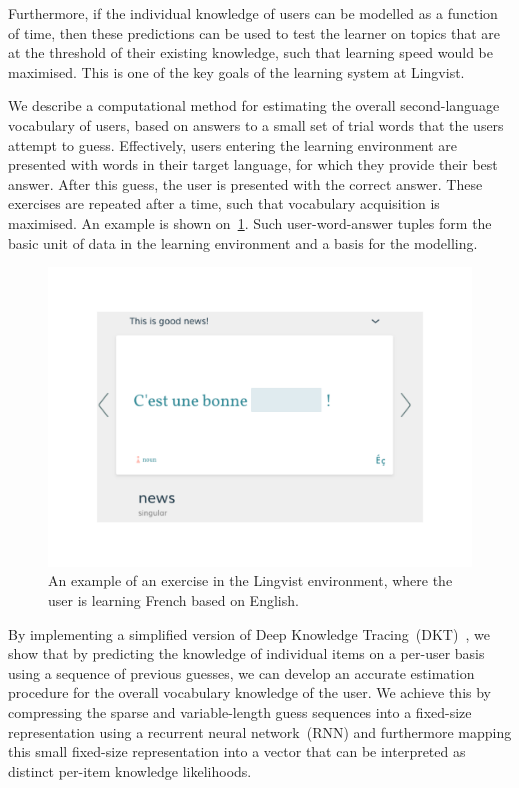 Furthermore, if the individual knowledge of users can be modelled as a function of time, then these predictions can be used to test the learner on topics that are at the threshold of their existing knowledge, such that learning speed would be maximised. This is one of the key goals of the learning system at Lingvist.

We describe a computational method for estimating the overall second-language vocabulary of users, based on answers to a small set of trial words that the users attempt to guess. Effectively, users entering the learning environment are presented with words in their target language, for which they provide their best answer. After this guess, the user is presented with the correct answer. These exercises are repeated after a time, such that vocabulary acquisition is maximised. An example is shown on~\cref{fig:lu_example}. Such user-word-answer tuples form the basic unit of data in the learning environment and a basis for the modelling.

\begin{figure}
\centering
\includegraphics[width=0.6\linewidth]{figures/lingvist/example_lu.pdf}
\caption[An example exercise in the Lingvist environment]{An example of an exercise in the Lingvist environment, where the user is learning French based on English.} 
\label{fig:lu_example} 
\end{figure} 

By implementing a simplified version of Deep Knowledge Tracing~(DKT)~\cite{DBLP:journals/corr/PiechSHGSGS15}, we show that by predicting the knowledge of individual items on a per-user basis using a sequence of previous guesses, we can develop an accurate estimation procedure for the overall vocabulary knowledge of the user. We achieve this by compressing the sparse and variable-length guess sequences into a fixed-size representation using a recurrent neural network~(RNN) and furthermore mapping this small fixed-size representation into a vector that can be interpreted as distinct per-item knowledge likelihoods.

